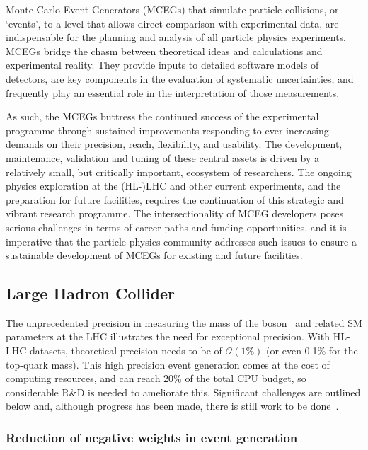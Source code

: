\documentclass[10pt,a4paper]{article}
\begin{document}
Monte Carlo Event Generators (MCEGs) that simulate particle collisions,
or `events', to a level that allows direct comparison with
experimental data, are indispensable for the planning and analysis of
all particle physics experiments. MCEGs bridge
the chasm between theoretical ideas and calculations
and experimental reality. They provide inputs to
detailed software models of detectors, are key components in the
evaluation of systematic uncertainties, and frequently
play an essential role in the interpretation of those measurements.

As such, the MCEGs buttress the continued success of the experimental programme
through sustained improvements responding to ever-increasing demands on their
precision, reach, flexibility, and usability. The development, maintenance,
validation and tuning of these central assets is driven by a relatively small,
but critically important, ecosystem of researchers. The ongoing physics
exploration at the (HL-)LHC and other current experiments, and the preparation
for future facilities, requires the continuation of this strategic and vibrant
research programme. The intersectionality of MCEG developers poses serious
challenges in terms of career paths and funding opportunities, and it is
imperative that the particle physics community addresses such issues to ensure a
sustainable development of MCEGs for existing and future facilities.

\subsection{Large Hadron Collider}\label{large-hadron-collider}

The unprecedented precision in measuring the mass of the 
boson~\cite{CMS:2024lrd} and related SM parameters at the LHC illustrates the
need for exceptional precision. With HL-LHC datasets, theoretical precision
needs to be of $\mathcal{O}(1\%)$ (or even 0.1\% for the top-quark mass). This
high precision event generation comes at the cost of computing resources, and
can reach 20\% of the total CPU budget, so considerable R\&D is needed to
ameliorate this. Significant challenges are outlined below and, although
progress has been made, there is still work to be
done~\cite{HSFPhysicsEventGeneratorWG:2020gxw,maltoni2022tf07snowmassreporttheory,10.21468/SciPostPhys.16.5.130}.

\subsubsection{Reduction of negative weights in event
generation}\label{reduction-of-negative-weights-in-event-generation}
\end{document}
